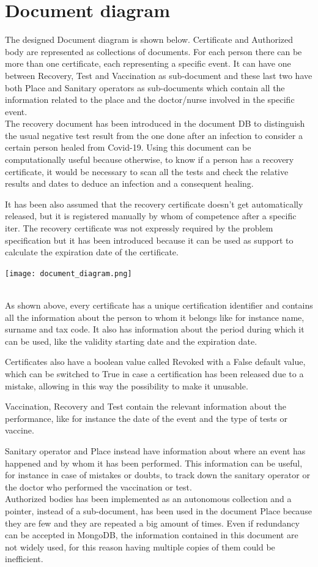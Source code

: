 \documentclass{article}
\begin{document}
\section{Document diagram}
The designed Document diagram is shown below. Certificate and Authorized body are represented as collections of documents.
For each person there can be more than one certificate, each representing a specific event. It can have one between Recovery, Test and Vaccination as sub-document and these last two have both Place and Sanitary operators as sub-documents which contain all the information related to the place and the doctor/nurse involved in the specific event.
\hfill\break
\\The recovery document has been introduced in the document DB to distinguish the usual negative test result from the one done after an infection to consider a certain person healed from Covid-19. Using this document can be computationally useful because otherwise, to know if a person has a recovery certificate, it would be necessary to scan all the tests and check the relative results and dates to deduce an infection and a consequent healing.

It has been also assumed that the recovery certificate doesn't get automatically released, but it is registered manually by whom of competence after a specific iter. The recovery certificate was not expressly required by the problem specification but it has been introduced because it can be used as support to calculate the expiration date of the certificate.
\hfill\break
\begin{center}
\texttt{[image: document\_diagram.png]}
\end{center}
\\
As shown above, every certificate has a unique certification identifier and contains all the information about the person to whom it belongs like for instance name, surname and tax code. It also has information about the period during which it can be used, like the validity starting date and the expiration date.

Certificates also have a boolean value called Revoked with a False default value, which can be switched to True in case a certification has been released due to a mistake, allowing in this way the possibility to make it unusable.

Vaccination, Recovery and Test contain the relevant information about the performance, like for instance the date of the event and the type of tests or vaccine.

Sanitary operator and Place instead have information about where an event has happened and by whom it has been performed. This information can be useful, for instance in case of mistakes or doubts, to track down the sanitary operator or the doctor who performed the vaccination or test.
\\ Authorized bodies has been implemented as an autonomous collection and a pointer, instead of a sub-document, has been used in the document Place because they are few and they are repeated a big amount of times. Even if redundancy can be accepted in MongoDB, the information contained in this document are not widely used, for this reason having multiple copies of them could be inefficient.
\end{document}
